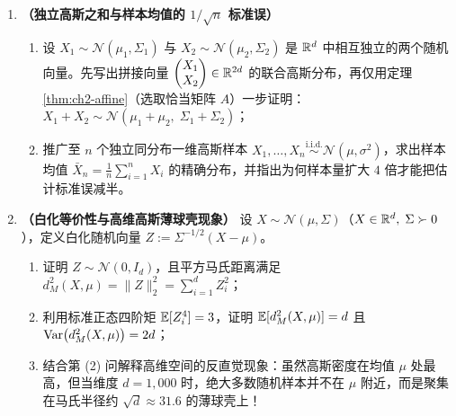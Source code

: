 \begin{enumerate}[label=\textbf{2.\arabic*}, leftmargin=2.4em, resume]
  \item \textbf{（独立高斯之和与样本均值的 $1/\sqrt{n}$ 标准误）}
  \begin{enumerate}[label=(\arabic*), leftmargin=1.8em]
    \item 设 $X_1 \sim \mathcal{N}(\mu_1, \Sigma_1)$ 与 $X_2 \sim \mathcal{N}(\mu_2, \Sigma_2)$ 是 $\mathbb{R}^d$ 中相互独立的两个随机向量。先写出拼接向量 $\begin{pmatrix} X_1 \\ X_2 \end{pmatrix} \in \mathbb{R}^{2d}$ 的联合高斯分布，再仅用定理 \ref{thm:ch2-affine}（选取恰当矩阵 $A$）一步证明：$X_1 + X_2 \sim \mathcal{N}(\mu_1 + \mu_2,\; \Sigma_1 + \Sigma_2)$；
    \item 推广至 $n$ 个独立同分布一维高斯样本 $X_1, \dots, X_n \stackrel{\text{i.i.d.}}{\sim} \mathcal{N}(\mu, \sigma^2)$，求出样本均值 $\bar{X}_n = \frac{1}{n}\sum_{i=1}^n X_i$ 的精确分布，并指出为何样本量扩大 $4$ 倍才能把估计标准误减半。
  \end{enumerate}

  \item \textbf{（白化等价性与高维高斯薄球壳现象）} 设 $X \sim \mathcal{N}(\mu, \Sigma)$（$X \in \mathbb{R}^d,\; \Sigma \succ 0$），定义白化随机向量 $Z := \Sigma^{-1/2}(X - \mu)$。
  \begin{enumerate}[label=(\arabic*), leftmargin=1.8em]
    \item 证明 $Z \sim \mathcal{N}(0, I_d)$，且平方马氏距离满足 $d_M^2(X, \mu) = \|Z\|_2^2 = \sum_{i=1}^d Z_i^2$；
    \item 利用标准正态四阶矩 $\mathbb{E}[Z_i^4] = 3$，证明 $\mathbb{E}[d_M^2(X, \mu)] = d$ 且 $\operatorname{Var}\bigl(d_M^2(X, \mu)\bigr) = 2d$；
    \item 结合第 (2) 问解释高维空间的反直觉现象：虽然高斯密度在均值 $\mu$ 处最高，但当维度 $d = 1{,}000$ 时，绝大多数随机样本并不在 $\mu$ 附近，而是聚集在马氏半径约 $\sqrt{d} \approx 31.6$ 的薄球壳上！
  \end{enumerate}
\end{enumerate}


